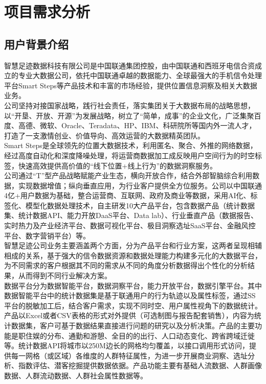 
\chapter{项目需求分析} %

\label{Chapter2} 
\section{用户背景介绍}
智慧足迹数据科技有限公司是中国联通集团控股，由中国联通和西班牙电信合资成立的专业大数据公司，依托中国联通卓越的数据能力、全球最强大的手机信令处理平台Smart Steps等产品技术和丰富的市场经验，提供位置信息洞察及相关大数据业务。\\
公司坚持对接国家战略，践行社会责任，落实集团关于大数据布局的战略思想，以“开垦、开放、开源”为发展战略，树立了“简单，成事”的企业文化，广泛集聚百度、高德、微软、Oracle、Teradata、HP、IBM、科研院所等国内外一流人才，打造了一支激情创业、价值导向、高效运营的大数据精英团队。\\
Smart Steps是全球领先的位置大数据技术，利用匿名、聚合、外推的网络数据，经过高度自动化和深度降噪处理，将运营商数据加工成反映用户空间行为的时空标签，快速高效提供高价值的“线下位置+线上行为”的数据洞察服务。\\
公司通过“T”型产品战略赋能产业生态，横向开放合作，结合外部智脑综合利用数据，实现数据增值；纵向垂直应用，为行业客户提供全方位服务。公司以中国联通4亿+用户数据为基础，整合运营商、互联网、政府及商业等数据，采用AI化、标签化、模型化数据处理技术，自主研发10大产品平台，包含数据产品（统计数据集、统计数据API、能力开放DaaS平台、Data lab）、行业垂直产品（数据报告、实时热力及产业经济平台、数据可视化平台、极目洞察选址SaaS平台、金融风控平台、数字营销平台）等。\\
智慧足迹公司业务主要涵盖两个方面，分为产品平台和行业方案，这两者呈现相辅相成的关系，基于强大的信令数据资源和数据处理能力构建多元化的大数据平台，为不同需求的客户根据其不同的需求从不同的角度分析数据得出个性化的分析结果，从而得到不同行业解决方案。\\
数据平台分为数据智能平台，数据洞察平台，能力开放平台，数据引擎平台。其中数据智能平台中的统计数据集是基于联通用户的行为轨迹以及属性标签，通过SS平台的脱敏加工后，结合客户需求，实现不同时空、用户属性视角下的数据统计。产品以Excel或者CSV表格的形式对外提供（可选制图与报告配套销售），内容为统计数据集，客户可基于数据结果直接进行问题的研究以及分析决策。产品的主要功能是职住娱的分布、通勤和游憩、全目的的出行、人口动态变化、跨省跨域迁徙等。统计数据API将城市以250M边长的网格均匀覆盖，以接口调用形式访问，提供每一网格（或区域）各维度的人群特征属性，为进一步开展商业洞察、选址分析、指数评估、潜客挖掘提供数据依据。产品功能主要有基础人流数据、人群画像数据、人群流动数据、人群社会属性数据等。\\
